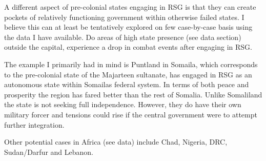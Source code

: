 \documentclass[12pt]{article}
\begin{document}
A different aspect of pre-colonial states engaging in RSG is that they can
create pockets of relatively functioning government within otherwise failed
states. I believe this can at least be tentatively explored on few case-by-case
basis using the data I have available. Do areas of high state presence (see data
section) outside the capital, experience a drop in combat events after engaging
in RSG. 

The example I primarily had in mind is  Puntland in Somaila, which corresponds
to the pre-colonial state of the Majarteen sultanate, has engaged in RSG as an
autonomous state within Somailas federal system. In terms of both peace and
prosperity the region has fared better than the rest of Somalia. Unlike
Somaliland the state is not seeking full independence. However, they do have
their own military forcer and tensions could rise if the central government were
to attempt further integration.

Other potential cases in Africa (see data) include Chad, Nigeria, DRC,
Sudan/Darfur and Lebanon.
\end{document}
